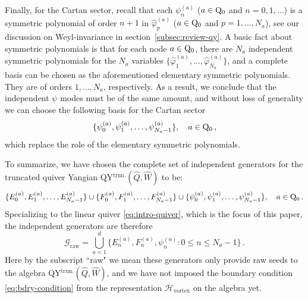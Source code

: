 \documentclass[12pt,a4paper]{article}
\newcommand{\cG}{\mathcal{G}}
\newcommand{\raw}{\mathrm{raw}}
\begin{document}
Finally, for the Cartan sector, recall that each $\psi^{(a)}_n$ ($a\in\rm Q_0$ and $n=0,1,\dots$) is a symmetric polynomial of order $n+1$ in $\hat{\varphi}^{(a)}_p$ ($a\in\rm Q_0$ and $p=1,\dots,N_a$), see our discussion on Weyl-invariance in section~\ref{subsec:review-qy}. A basic fact about symmetric polynomials is that for each node $a\in\rm Q_0$, there are $N_a$ independent symmetric polynomials for the $N_a$ variables $\{\hat{\varphi}^{(a)}_1,\dots,\hat{\varphi}^{(a)}_{N_a}\}$, and a complete basis can be chosen as the aforementioned elementary symmetric polynomials. They are of orders $1,\dots, N_a$, respectively. As a result, we conclude that the independent $\psi$ modes must be of the same amount, and without loss of generality we can choose the following basis for the Cartan sector
\begin{equation}
    \{\psi^{(a)}_0,\psi^{(a)}_1,\dots,\psi^{(a)}_{N_a-1}\},\quad a\in \rm Q_0\,,
\end{equation}
which replace the role of the elementary symmetric polynomials.

\medskip

To summarize, we have chosen the complete set of independent generators for the truncated quiver Yangian QY$^{\text{trun.}}(\hat{Q},\hat W)$ to be:
\begin{equation}
    \{E^{(a)}_0,E^{(a)}_1,\dots,E^{(a)}_{N_a-1}\}\cup \{F^{(a)}_0,F^{(a)}_1,\dots,F^{(a)}_{N_a-1}\}\cup \{\psi^{(a)}_0,\psi^{(a)}_1,\dots,\psi^{(a)}_{N_a-1}\},\quad a\in\rm Q_0\,.
\end{equation}
Specializing to the linear quiver \eqref{eq:intro-quiver}, which is the focus of this paper, the independent generators are therefore
\begin{equation}
 \cG_{\raw}=\bigcup_{a=1}^{d}
 \{E_n^{(a)},F_n^{(a)},\psi_n^{(a)}:0\leq n\leq N_a-1\}\,.
 \label{eq:raw-seed}
\end{equation}
Here by the subscript ``raw" we mean these generators only provide raw seeds to the algebra QY$^{\text{trun.}}(\hat{Q},\hat W)$, and we have not imposed the boundary condition \eqref{eq:bdry-condition} from the representation $\mathcal H_{\text{vortex}}$ on the algebra yet.

\bigskip
\end{document}
